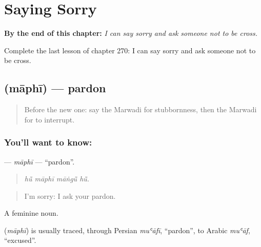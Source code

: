 
\chapter{Saying Sorry}
\label{ch:mw-saying-sorry}

\begin{chapteropening}
\textbf{By the end of this chapter:} \emph{I can say sorry and ask someone not to be cross.}

Complete the last lesson of chapter 270: I can say sorry and ask someone not to be cross.
\end{chapteropening}

\section[\texorpdfstring{\mw{माफी} (māphī)}{माफी (māphī)}]{ (māphī) — pardon}

\label{lesson:MW-C270-maphi}



\begin{quote}
Before the new one: say the Marwadi for stubbornness, then the Marwadi for to interrupt.
\end{quote}

\subsection*{You'll want to know: }
\textbf{} — \emph{māphī} — \textquotedblleft{}pardon\textquotedblright{}.

\begin{quote}
   
\end{quote}

\begin{quote}
\emph{hū̃ māphī māṅgū̃ hū̃.}
\end{quote}

\begin{quote}
I'm sorry: I ask your pardon.
\end{quote}

A feminine noun.

\begin{cousinweb}
\textbf{} (\emph{māphī}) is usually traced, through Persian \emph{muʿāfī}, \textquotedblleft{}pardon\textquotedblright{}, to Arabic \emph{muʿāf}, \textquotedblleft{}excused\textquotedblright{}.
\end{cousinweb}


